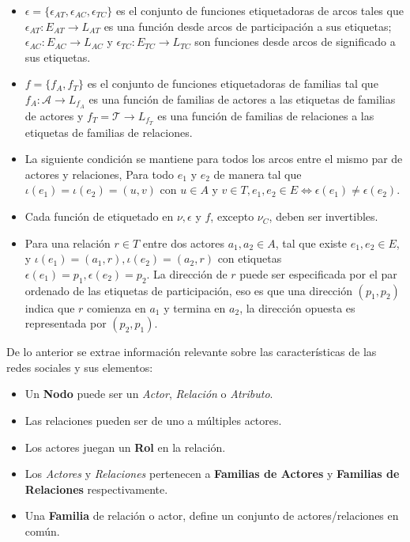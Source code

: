 \begin{defn}
\begin{itemize}
    \item $\epsilon = \{ \epsilon_{AT} , \epsilon_{AC} , \epsilon_{TC} \}$ es el conjunto de funciones etiquetadoras de arcos tales que $ \epsilon_{AT} : E_{AT} \longrightarrow L_{AT}$ es una función desde arcos de participación a sus etiquetas; $ \epsilon_{AC} : E_{AC} \longrightarrow L_{AC}$ y $ \epsilon_{TC} : E_{TC} \longrightarrow L_{TC}$ son funciones desde arcos de significado a sus etiquetas.
    \item $f = \{f_A, f_T\}$ es el conjunto de funciones etiquetadoras de familias tal que $f_A : \mathcal{A} \longrightarrow L_{f_A}$ es una función de familias de actores a las etiquetas de familias de actores y $f_T = \mathcal{T} \longrightarrow L_{f_T}$ es una función de familias de relaciones a las etiquetas de familias de relaciones.
    \item La siguiente condición se mantiene para todos los arcos entre el mismo par de actores y relaciones, Para todo $e_1$ y $e_2$ de manera tal que $\iota(e_1) = \iota(e_2) = (u,v)$ con $u \in A$ y $v \in T, e_1, e_2 \in E \Leftrightarrow \epsilon(e_1) \neq \epsilon(e_2)$.
    \item Cada función de etiquetado en $\nu, \epsilon$ y $f$, excepto $\nu_C$, deben ser invertibles.
    \item Para una relación $r \in T$ entre dos actores $a_1, a_2 \in A$, tal que existe $e_1, e_2 \in E$, y $\iota(e_1) = (a_1, r), \iota(e_2) = (a_2, r)$ con etiquetas $\epsilon(e_1) = p_1, \epsilon(e_2) = p_2$. La dirección de $r$ puede ser especificada por el par ordenado de las etiquetas de participación, eso es que una dirección $(p_1, p_2)$ indica que $r$ comienza en $a_1$ y termina en $a_2$, la dirección opuesta es representada por $(p_2, p_1)$.
  \end{itemize}
\end{defn}

De lo anterior se extrae información relevante sobre las características de las redes sociales y sus elementos:

\begin{itemize}
  \item Un \textbf{Nodo} puede ser un \emph{Actor}, \emph{Relación} o \emph{Atributo}.
  \item Las relaciones pueden ser de uno a múltiples actores.
  \item Los actores juegan un \textbf{Rol} en la relación.
  \item Los \emph{Actores} y \emph{Relaciones} pertenecen a \textbf{Familias de Actores} y \textbf{Familias de Relaciones} respectivamente.
  \item Una \textbf{Familia} de relación o actor, define un conjunto de actores/relaciones en común.
\end{itemize}

